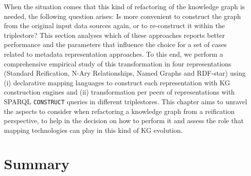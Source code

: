 When the situation comes that this kind of refactoring of the knowledge graph is needed, the following question arises: Is more convenient to construct the graph from the original input data sources again, or to re-construct it within the triplestore? This section analyses which of these approaches reports better performance and the parameters that influence the choice for a set of cases related to metadata representation approaches. 
To this end, we perform a comprehensive empirical study of this transformation in four representations (Standard Reification, N-Ary Relationships, Named Graphs and RDF-star) using (i) declarative mapping languages to construct each representation with KG construction engines and (ii) transformation per peers of representations with SPARQL \texttt{CONSTRUCT} queries in different triplestores. 
This chapter aims to unravel the aspects to consider when refactoring a knowledge graph from a reification perspective, to help in the decision on how to perform it and assess the role that mapping technologies can play in this kind of KG evolution. %



\section{Summary}


